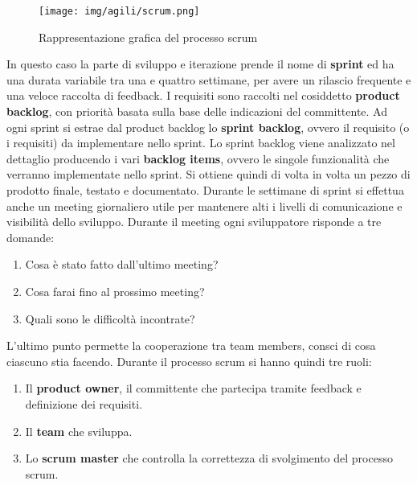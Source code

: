 \begin{figure}[!ht]
      \centering
      \texttt{[image: img/agili/scrum.png]}
      \caption{Rappresentazione grafica del processo scrum}
      \label{fig:scrum}
\end{figure}
In questo caso la parte di sviluppo e iterazione prende il nome di \textbf{sprint}
ed ha una durata variabile tra una e quattro settimane, per avere un rilascio
frequente e una veloce raccolta di feedback. I requisiti sono raccolti nel cosiddetto
\textbf{product backlog}, con priorità basata sulla base delle indicazioni del
committente. Ad ogni sprint si estrae dal product backlog lo \textbf{sprint backlog},
ovvero il requisito (o i requisiti) da implementare nello sprint. Lo sprint backlog
viene analizzato nel dettaglio producendo i vari \textbf{backlog items}, ovvero
le singole funzionalità che verranno implementate nello sprint. Si ottiene quindi
di volta in volta un pezzo di prodotto finale, testato e documentato. Durante le
settimane di sprint si effettua anche un meeting giornaliero utile per mantenere
alti i livelli di comunicazione e visibilità dello sviluppo. Durante il meeting
ogni sviluppatore risponde a tre domande:
\begin{enumerate}
      \item Cosa è stato fatto dall'ultimo meeting?
      \item Cosa farai fino al prossimo meeting?
      \item Quali sono le difficoltà incontrate?
\end{enumerate}

L’ultimo punto permette la cooperazione tra team members, consci di cosa ciascuno
stia facendo. Durante il processo scrum si hanno quindi tre ruoli:
\begin{enumerate}
      \item Il \textbf{product owner}, il committente che partecipa tramite feedback
            e definizione dei requisiti.
      \item Il \textbf{team} che sviluppa.
      \item Lo \textbf{scrum master} che controlla la correttezza di svolgimento
            del processo scrum.
\end{enumerate}


